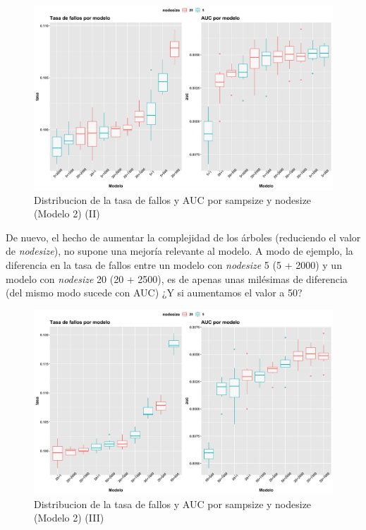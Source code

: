 \documentclass[
]{article}
\begin{document}
\begin{figure}[h!]

{\centering \includegraphics[width=0.99\linewidth,height=0.99\textheight,]{./charts/03_distribucion_auc_tasa_fallos_modelo2_comp} 

}

\caption{Distribucion de la tasa de fallos y AUC por sampsize y nodesize (Modelo 2) (II)}\label{fig:unnamed-chunk-77}
\end{figure}

De nuevo, el hecho de aumentar la complejidad de los árboles (reduciendo
el valor de \emph{nodesize}), no supone una mejoría relevante al modelo.
A modo de ejemplo, la diferencia en la tasa de fallos entre un modelo
con \emph{nodesize} 5 (5 + 2000) y un modelo con \emph{nodesize} 20 (20
+ 2500), es de apenas unas milésimas de diferencia (del mismo modo
sucede con AUC) ¿Y si aumentamos el valor a 50?

\begin{figure}[h!]

{\centering \includegraphics[width=0.99\linewidth,height=0.99\textheight,]{./charts/03_distribucion_auc_tasa_fallos_modelo2_comp_50rep} 

}

\caption{Distribucion de la tasa de fallos y AUC por sampsize y nodesize (Modelo 2) (III)}\label{fig:unnamed-chunk-78}
\end{figure}
\end{document}
